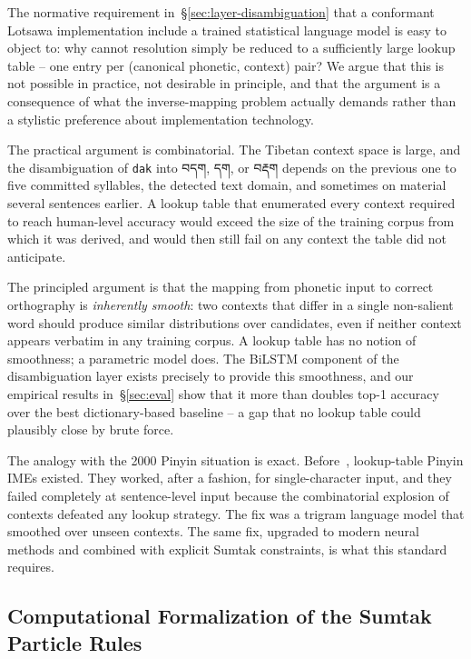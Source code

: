 \documentclass[11pt]{article}
\newcommand{\tib}[1]{{\fontspec{Jomolhari}#1}}
\begin{document}
The normative requirement in~\S\ref{sec:layer-disambiguation} that a conformant Lotsawa implementation include a trained statistical language model is easy to object to: why cannot resolution simply be reduced to a sufficiently large lookup table -- one entry per (canonical phonetic, context) pair? We argue that this is not possible in practice, not desirable in principle, and that the argument is a consequence of what the inverse-mapping problem actually demands rather than a stylistic preference about implementation technology.

The practical argument is combinatorial. The Tibetan context space is large, and the disambiguation of \texttt{dak} into \tib{བདག}, \tib{དག}, or \tib{བརྡག} depends on the previous one to five committed syllables, the detected text domain, and sometimes on material several sentences earlier. A lookup table that enumerated every context required to reach human-level accuracy would exceed the size of the training corpus from which it was derived, and would then still fail on any context the table did not anticipate.

The principled argument is that the mapping from phonetic input to correct orthography is \emph{inherently smooth}: two contexts that differ in a single non-salient word should produce similar distributions over candidates, even if neither context appears verbatim in any training corpus. A lookup table has no notion of smoothness; a parametric model does. The BiLSTM component of the disambiguation layer exists precisely to provide this smoothness, and our empirical results in~\S\ref{sec:eval} show that it more than doubles top-1 accuracy over the best dictionary-based baseline -- a gap that no lookup table could plausibly close by brute force.

The analogy with the 2000 Pinyin situation is exact. Before~\citet{chen2000pinyin}, lookup-table Pinyin IMEs existed. They worked, after a fashion, for single-character input, and they failed completely at sentence-level input because the combinatorial explosion of contexts defeated any lookup strategy. The fix was a trigram language model that smoothed over unseen contexts. The same fix, upgraded to modern neural methods and combined with explicit Sumtak constraints, is what this standard requires.

\subsection{Computational Formalization of the Sumtak Particle Rules}
\label{sec:sumtak}
\end{document}

